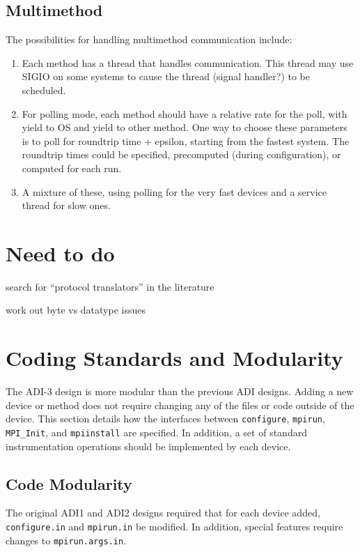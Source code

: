 \documentclass{article}
\let\file=\texttt
\let\code=\texttt
\begin{document}
\subsection{Multimethod}

The possibilities for handling multimethod communication include:
\begin{enumerate}
\item Each method has a thread that handles communication.  This thread may
  use SIGIO on some systems to cause the thread (signal handler?) to be
  scheduled. 
\item For polling mode, each method should have a relative rate for the poll,
  with yield to OS and yield to other method.  One way to choose these
  parameters is to poll for roundtrip time + epsilon, starting from the
  fastest system.  The roundtrip times could be specified, precomputed (during
  configuration), or computed for each run.
\item A mixture of these, using polling for the very fast devices and a
  service thread for slow ones.
\end{enumerate}

\section{Need to do}

search for ``protocol translators'' in the literature

work out byte vs datatype issues


\section{Coding Standards and Modularity}
The ADI-3 design is more modular than the previous ADI designs.  Adding a new
device or method does not require changing any of the files or code outside
of the device.  This section details how the interfaces between
\code{configure}, \code{mpirun}, \code{MPI\_Init}, and \code{mpiinstall} are
specified.  In addition, a set of standard instrumentation operations should
be implemented by each device.

\subsection{Code Modularity}
The original ADI1 and ADI2 designs required that for each device added, 
\file{configure.in} and \file{mpirun.in} be modified.  In addition, special
features require changes to \file{mpirun.args.in}.  
\end{document}
